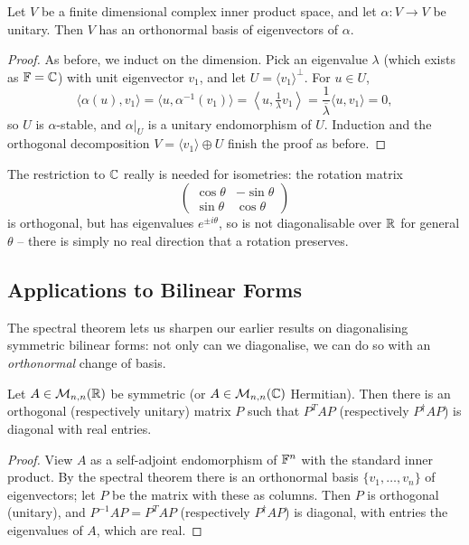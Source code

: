 \documentclass[a4paper]{scrartcl}
\begin{document}
\begin{theorem}
    Let $V$ be a finite dimensional complex inner product space, and let $\alpha: V \rightarrow V$ be unitary. Then $V$ has an orthonormal basis of eigenvectors of $\alpha$.
\end{theorem}
\begin{proof}
    As before, we induct on the dimension. Pick an eigenvalue $\lambda$ (which exists as $\mathbb{F} = \mathbb{C}$) with unit eigenvector $v_1$, and let $U = \langle v_1\rangle^\perp$. For $u \in U$,
    $$
    \langle \alpha(u), v_1 \rangle = \langle u, \alpha^{-1}(v_1)\rangle = \left\langle u, \tfrac{1}{\lambda}v_1 \right\rangle = \frac{1}{\overline{\lambda}}\langle u, v_1 \rangle = 0,
    $$
    so $U$ is $\alpha$-stable, and $\alpha|_U$ is a unitary endomorphism of $U$. Induction and the orthogonal decomposition $V = \langle v_1 \rangle \oplus U$ finish the proof as before.
\end{proof}

\begin{remark}
    The restriction to $\mathbb{C}$ really is needed for isometries: the rotation matrix
    $$
    \begin{pmatrix}
        \cos\theta & -\sin\theta \\ \sin\theta & \cos\theta
    \end{pmatrix}
    $$
    is orthogonal, but has eigenvalues $e^{\pm i\theta}$, so is not diagonalisable over $\mathbb{R}$ for general $\theta$ -- there is simply no real direction that a rotation preserves.
\end{remark}

\subsection{Applications to Bilinear Forms}

The spectral theorem lets us sharpen our earlier results on diagonalising symmetric bilinear forms: not only can we diagonalise, we can do so with an \emph{orthonormal} change of basis.

\begin{corollary}
    Let $A \in \mathcal{M}_{n,n}(\mathbb{R})$ be symmetric (or $A \in \mathcal{M}_{n,n}(\mathbb{C})$ Hermitian). Then there is an orthogonal (respectively unitary) matrix $P$ such that $P^TAP$ (respectively $P^\dagger A P$) is diagonal with real entries.
\end{corollary}
\begin{proof}
    View $A$ as a self-adjoint endomorphism of $\mathbb{F}^n$ with the standard inner product. By the spectral theorem there is an orthonormal basis $\{v_1, \dots, v_n\}$ of eigenvectors; let $P$ be the matrix with these as columns. Then $P$ is orthogonal (unitary), and $P^{-1}AP = P^TAP$ (respectively $P^\dagger AP$) is diagonal, with entries the eigenvalues of $A$, which are real.
\end{proof}
\end{document}
